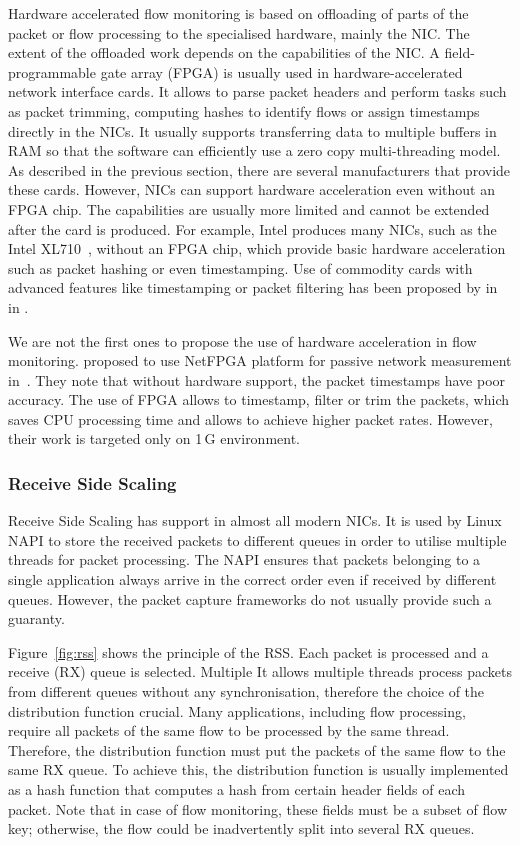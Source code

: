 Hardware accelerated flow monitoring is based on offloading of parts of the packet or flow processing to the specialised hardware, mainly the NIC. The extent of the offloaded work depends on the capabilities of the NIC. A field-programmable gate array (FPGA) is usually used in hardware-accelerated network interface cards. It allows to parse packet headers and perform tasks such as packet trimming, computing hashes to identify flows or assign timestamps directly in the NICs. It usually supports transferring data to multiple buffers in RAM so that the software can efficiently use a zero copy multi-threading model. As described in the previous section, there are several manufacturers that provide these cards. However, NICs can support hardware acceleration even without an FPGA chip. The capabilities are usually more limited and cannot be extended after the card is produced. For example, Intel produces many NICs, such as the Intel XL710~\cite{IntelCorporation-2014-xl710}, without an FPGA chip, which provide basic hardware acceleration such as packet hashing or even timestamping. Use of commodity cards with advanced features like timestamping or packet filtering has been proposed by \citeauthor{Deri-2013-10} in~\cite{Deri-2013-10} in \citeyear{Deri-2013-10}.

We are not the first ones to propose the use of hardware acceleration in flow monitoring. \citeauthor{Antichi-2012-Enabling} proposed to use NetFPGA platform for passive network measurement in~\cite{Antichi-2012-Enabling}. They note that without hardware support, the packet timestamps have poor accuracy. The use of FPGA allows to timestamp, filter or trim the packets, which saves CPU processing time and allows to achieve higher packet rates. However, their work is targeted only on 1\,G environment.

\subsubsection{Receive Side Scaling}
Receive Side Scaling has support in almost all modern NICs. It is used by Linux NAPI to store the received packets to different queues in order to utilise multiple threads for packet processing. The NAPI ensures that packets belonging to a single application always arrive in the correct order even if received by different queues. However, the packet capture frameworks do not usually provide such a guaranty.

Figure~\ref{fig:rss} shows the principle of the RSS. Each packet is processed and a receive (RX) queue is selected. Multiple It allows multiple threads process packets from different queues without any synchronisation, therefore the choice of the distribution function crucial. Many applications, including flow processing, require all packets of the same flow to be processed by the same thread. Therefore, the distribution function must put the packets of the same flow to the same RX queue. To achieve this, the distribution function is usually implemented as a hash function that computes a hash from certain header fields of each packet. Note that in case of flow monitoring, these fields must be a subset of flow key; otherwise, the flow could be inadvertently split into several RX queues. 

